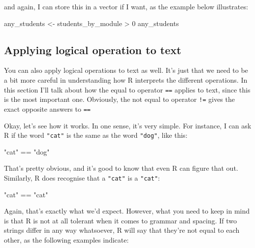 \documentclass[
]{book}
\newenvironment{Shaded}{\begin{snugshade}}{\end{snugshade}}
\newcommand{\DecValTok}[1]{\textcolor[rgb]{0.00,0.00,0.81}{#1}}
\newcommand{\NormalTok}[1]{#1}
\newcommand{\OtherTok}[1]{\textcolor[rgb]{0.56,0.35,0.01}{#1}}
\newcommand{\SpecialCharTok}[1]{\textcolor[rgb]{0.00,0.00,0.00}{#1}}
\newcommand{\StringTok}[1]{\textcolor[rgb]{0.31,0.60,0.02}{#1}}
\begin{document}
and again, I can store this in a vector if I want, as the example below illustrates:

\begin{Shaded}
\begin{Highlighting}[]
\NormalTok{any\_students }\OtherTok{\textless{}{-}}\NormalTok{ students\_by\_module }\SpecialCharTok{\textgreater{}} \DecValTok{0}
\NormalTok{any\_students}
\end{Highlighting}
\end{Shaded}

\hypertarget{logictext}{%
\subsection{Applying logical operation to text}\label{logictext}}

You can also apply logical operations to text as well. It's just that we need to be a bit more careful in understanding how R interprets the different operations. In this section I'll talk about how the equal to operator \texttt{==} applies to text, since this is the most important one. Obviously, the not equal to operator \texttt{!=} gives the exact opposite answers to \texttt{==}

Okay, let's see how it works. In one sense, it's very simple. For instance, I can ask R if the word \texttt{"cat"} is the same as the word \texttt{"dog"}, like this:

\begin{Shaded}
\begin{Highlighting}[]
\StringTok{"cat"} \SpecialCharTok{==} \StringTok{"dog"}
\end{Highlighting}
\end{Shaded}

That's pretty obvious, and it's good to know that even R can figure that out. Similarly, R does recognise that a \texttt{"cat"} is a \texttt{"cat"}:

\begin{Shaded}
\begin{Highlighting}[]
\StringTok{"cat"} \SpecialCharTok{==} \StringTok{"cat"}
\end{Highlighting}
\end{Shaded}

Again, that's exactly what we'd expect. However, what you need to keep in mind is that R is not at all tolerant when it comes to grammar and spacing. If two strings differ in any way whatsoever, R will say that they're not equal to each other, as the following examples indicate:
\end{document}
